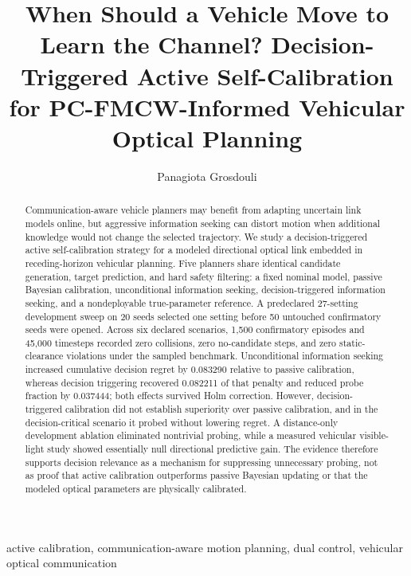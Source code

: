 \documentclass[journal]{IEEEtran}
\title{When Should a Vehicle Move to Learn the Channel? Decision-Triggered Active Self-Calibration for PC-FMCW-Informed Vehicular Optical Planning}
\author{Panagiota Grosdouli}
\begin{document}
\maketitle

\begin{abstract}
Communication-aware vehicle planners may benefit from adapting uncertain link models online, but aggressive information seeking can distort motion when additional knowledge would not change the selected trajectory. We study a decision-triggered active self-calibration strategy for a modeled directional optical link embedded in receding-horizon vehicular planning. Five planners share identical candidate generation, target prediction, and hard safety filtering: a fixed nominal model, passive Bayesian calibration, unconditional information seeking, decision-triggered information seeking, and a nondeployable true-parameter reference. A predeclared 27-setting development sweep on 20 seeds selected one setting before 50 untouched confirmatory seeds were opened. Across six declared scenarios, 1,500 confirmatory episodes and 45,000 timesteps recorded zero collisions, zero no-candidate steps, and zero static-clearance violations under the sampled benchmark. Unconditional information seeking increased cumulative decision regret by 0.083290 relative to passive calibration, whereas decision triggering recovered 0.082211 of that penalty and reduced probe fraction by 0.037444; both effects survived Holm correction. However, decision-triggered calibration did not establish superiority over passive calibration, and in the decision-critical scenario it probed without lowering regret. A distance-only development ablation eliminated nontrivial probing, while a measured vehicular visible-light study showed essentially null directional predictive gain. The evidence therefore supports decision relevance as a mechanism for suppressing unnecessary probing, not as proof that active calibration outperforms passive Bayesian updating or that the modeled optical parameters are physically calibrated.
\end{abstract}

\begin{IEEEkeywords}
active calibration, communication-aware motion planning, dual control, vehicular optical communication
\end{IEEEkeywords}
\end{document}
